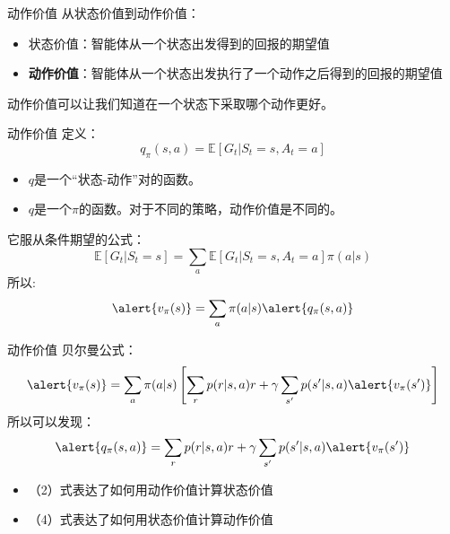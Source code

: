 \begin{frame}{动作价值}
    从状态价值到动作价值：
    \begin{itemize}
        \item 状态价值：智能体从一个状态出发得到的回报的期望值
        \item \textbf{动作价值}：智能体从一个状态出发执行了一个动作之后得到的回报的期望值
    \end{itemize}
    动作价值可以让我们知道在一个状态下采取哪个动作更好。
\end{frame}

\begin{frame}{动作价值}
    定义：
    \[
        q_\pi(s,a)=\mathbb{E}[G_t|S_t=s,A_t=a]
    \]
    \begin{itemize}
        \item $q$是一个“状态-动作”对的函数。
        \item $q$是一个$\pi$的函数。对于不同的策略，动作价值是不同的。
    \end{itemize}
    它服从条件期望的公式：
    \begin{equation}
        \mathbb{E}[G_t|S_t=s]=\sum_a\mathbb{E}[G_t|S_t=s,A_t=a]\pi(a|s)
    \end{equation}
    所以:
    \begin{equation}
        \alert{v_\pi(s)}=\sum_a \pi(a|s)\alert{q_\pi(s,a)}
    \end{equation}
\end{frame}

\begin{frame}{动作价值}
    贝尔曼公式：
    \begin{equation}
        \alert{v_\pi(s)}=\sum_a\pi(a|s)\left[\sum_r p(r|s,a)r+\gamma\sum_{s'}p(s'|s,a)\alert{v_{\pi}(s')}\right]
    \end{equation}
    所以可以发现：
    \begin{equation}
        \alert{q_\pi(s,a)}=\sum_r p(r|s,a)r+\gamma\sum_{s'}p(s'|s,a)\alert{v_{\pi}(s')}
    \end{equation}
    \begin{itemize}
        \item （2）式表达了如何用动作价值计算状态价值
        \item （4）式表达了如何用状态价值计算动作价值
    \end{itemize}
\end{frame}

